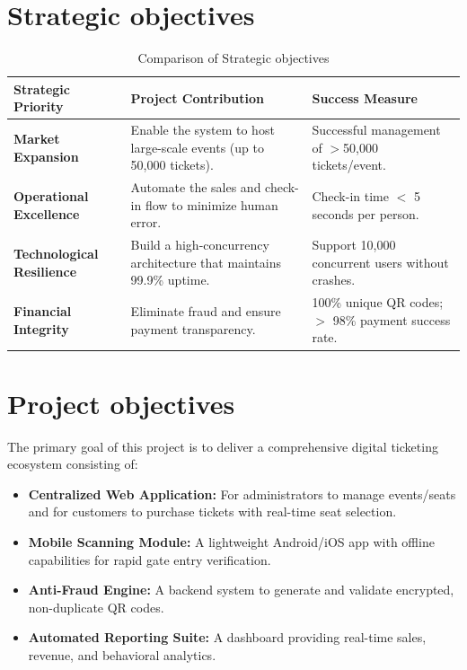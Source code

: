 \section{Strategic objectives}

\begin{table}[H]
\centering
\renewcommand{\arraystretch}{1.5}
\begin{tabularx}{\textwidth}{|>{\bfseries}p{3.5cm}|X|X|}
\hline
\rowcolor[HTML]{1F85B5} 
\color{white}Strategic Priority & \color{white}Project Contribution & \color{white}Success Measure \\ \hline
\rowcolor[HTML]{DAEEF3} 
Market Expansion & Enable the system to host large-scale events (up to 50,000 tickets). & Successful management of $>$50,000 tickets/event. \\ \hline
\rowcolor[HTML]{FFFFFF} 
Operational Excellence & Automate the sales and check-in flow to minimize human error. & Check-in time $<$ 5 seconds per person. \\ \hline
\rowcolor[HTML]{DAEEF3} 
Technological Resilience & Build a high-concurrency architecture that maintains 99.9\% uptime. & Support 10,000 concurrent users without crashes. \\ \hline
\rowcolor[HTML]{FFFFFF} 
Financial Integrity & Eliminate fraud and ensure payment transparency. & 100\% unique QR codes; $>$ 98\% payment success rate. \\ \hline
\end{tabularx}
\caption{Comparison of Strategic objectives}
\end{table}

\section{Project objectives}

The primary goal of this project is to deliver a comprehensive digital ticketing ecosystem consisting of:
\begin{itemize}
    \item \textbf{Centralized Web Application:} For administrators to manage events/seats and for customers to purchase tickets with real-time seat selection.
    \item \textbf{Mobile Scanning Module:} A lightweight Android/iOS app with offline capabilities for rapid gate entry verification.
    \item \textbf{Anti-Fraud Engine:} A backend system to generate and validate encrypted, non-duplicate QR codes.
    \item \textbf{Automated Reporting Suite:} A dashboard providing real-time sales, revenue, and behavioral analytics.
\end{itemize}

